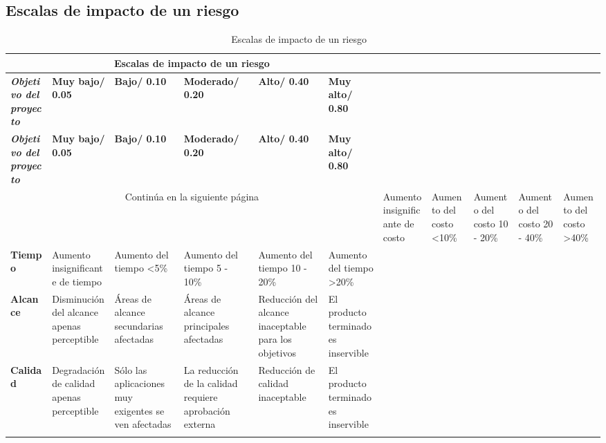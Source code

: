 \subsection{Escalas de impacto de un riesgo}
\begin{longtable}{| p{2.5cm} | p{2.5cm} | p{2.5cm} | p{2.3cm} | p{2.5cm} | p{2.5cm} |}

\hline
\multicolumn{6}{|c|}{\textbf{Escalas de impacto de un riesgo}} \\ \hline
\textit{\textbf{Objetivo del proyecto}} & \textbf{Muy bajo/ 0.05} & \textbf{Bajo/ 0.10} & \textbf{Moderado/ 0.20} & \textbf{Alto/ 0.40} & \textbf{Muy alto/ 0.80}\\
\hline \hline
\endfirsthead

\hline
\textit{\textbf{Objetivo del proyecto}} & \textbf{Muy bajo/ 0.05} & \textbf{Bajo/ 0.10} & \textbf{Moderado/ 0.20} & \textbf{Alto/ 0.40} & \textbf{Muy alto/ 0.80}\\
\hline \hline
\endhead

\multicolumn{6}{|c|}{Continúa en la siguiente página}
\endfoot

\endlastfoot


\textbf{Costo} & Aumento insignificante de costo & Aumento del costo <10\% & Aumento del costo 10 - 20\% & Aumento del costo 20 - 40\% & Aumento del costo >40\% \\ \hline
\textbf{Tiempo} & Aumento insignificante de tiempo & Aumento del tiempo <5\% & Aumento del tiempo 5 - 10\% & Aumento del tiempo 10 - 20\% & Aumento del tiempo >20\% \\ \hline
\textbf{Alcance} & Disminución del alcance apenas perceptible & Áreas de alcance secundarias afectadas & Áreas de alcance principales afectadas & Reducción del alcance inaceptable para los objetivos & El producto terminado es inservible\\ \hline
\textbf{Calidad} & Degradación de calidad apenas perceptible & Sólo las aplicaciones muy exigentes se ven afectadas & La reducción de la calidad requiere aprobación externa & Reducción de calidad inaceptable & El producto terminado es inservible\\ \hline

\caption{Escalas de impacto de un riesgo ~\cite{sommerville}} 
\label{Riesgos}
\end{longtable}


